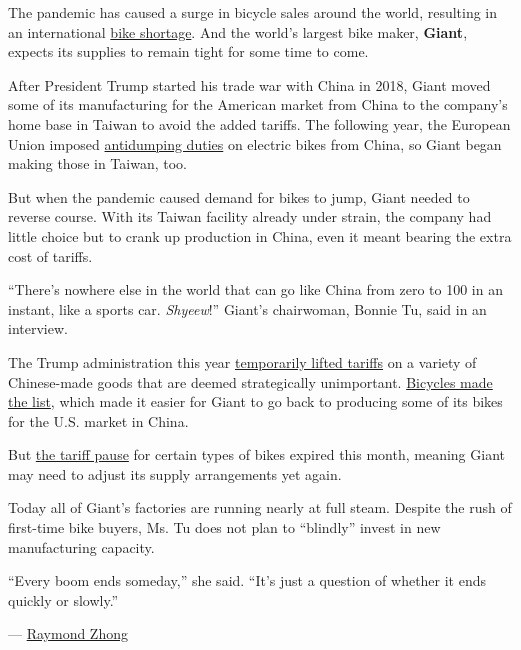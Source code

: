 The pandemic has caused a surge in bicycle sales around the world,
resulting in an international
\href{https://www.nytimes3xbfgragh.onion/2020/05/18/nyregion/bike-shortage-coronavirus.html}{bike
shortage}. And the world's largest bike maker, \textbf{Giant}, expects
its supplies to remain tight for some time to come.

After President Trump started his trade war with China in 2018, Giant
moved some of its manufacturing for the American market from China to
the company's home base in Taiwan to avoid the added tariffs. The
following year, the European Union imposed
\href{https://www.bicycleretailer.com/international/2019/01/18/eu-imposes-stiff-anti-dumping-duties-chinese-e-bikes\#.XyNs2xMzZmg}{antidumping
duties} on electric bikes from China, so Giant began making those in
Taiwan, too.

But when the pandemic caused demand for bikes to jump, Giant needed to
reverse course. With its Taiwan facility already under strain, the
company had little choice but to crank up production in China, even it
meant bearing the extra cost of tariffs.

``There's nowhere else in the world that can go like China from zero to
100 in an instant, like a sports car. \emph{Shyeew}!'' Giant's
chairwoman, Bonnie Tu, said in an interview.

The Trump administration this year
\href{https://ustr.gov/sites/default/files/enforcement/301Investigations/\%24200_Billion_Exclusions_Granted_April_2020.pdf}{temporarily
lifted tariffs} on a variety of Chinese-made goods that are deemed
strategically unimportant.
\href{https://www.federalregister.gov/documents/2020/02/05/2020-02225/notice-of-product-exclusions-chinas-acts-policies-and-practices-related-to-technology-transfer}{Bicycles
made the list}, which made it easier for Giant to go back to producing
some of its bikes for the U.S. market in China.

But \href{https://peopleforbikes.org/exclusions/}{the tariff pause} for
certain types of bikes expired this month, meaning Giant may need to
adjust its supply arrangements yet again.

Today all of Giant's factories are running nearly at full steam. Despite
the rush of first-time bike buyers, Ms. Tu does not plan to ``blindly''
invest in new manufacturing capacity.

``Every boom ends someday,'' she said. ``It's just a question of whether
it ends quickly or slowly.''

--- \href{https://www.nytimes3xbfgragh.onion/by/raymond-zhong}{Raymond
Zhong}

